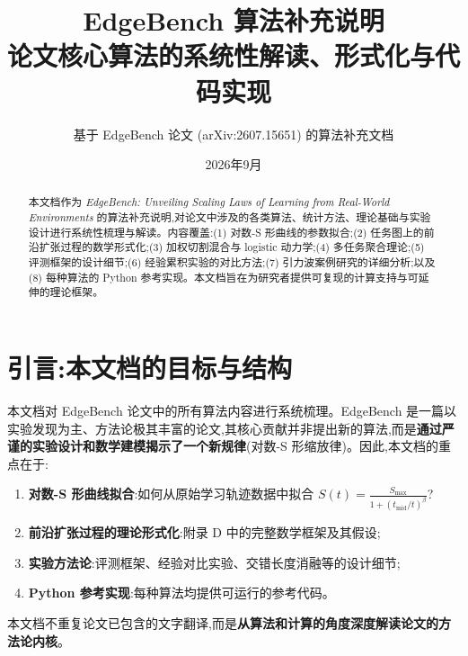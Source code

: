 \documentclass[a4paper,11pt]{article}
\begin{document}
\title{
    \vspace{-1.5em}
    {\LARGE\textbf{EdgeBench 算法补充说明}}\\[0.5em]
    {\large 论文核心算法的系统性解读、形式化与代码实现}
}

\author{基于 EdgeBench 论文 (arXiv:2607.15651) 的算法补充文档}
\date{2026年9月}

\maketitle

\begin{abstract}
本文档作为 \textit{EdgeBench: Unveiling Scaling Laws of Learning from Real-World Environments} 的算法补充说明,对论文中涉及的各类算法、统计方法、理论基础与实验设计进行系统性梳理与解读。内容覆盖:(1) 对数-S 形曲线的参数拟合;(2) 任务图上的前沿扩张过程的数学形式化;(3) 加权切割混合与 logistic 动力学;(4) 多任务聚合理论;(5) 评测框架的设计细节;(6) 经验累积实验的对比方法;(7) 引力波案例研究的详细分析;以及(8) 每种算法的 Python 参考实现。本文档旨在为研究者提供可复现的计算支持与可延伸的理论框架。
\end{abstract}

\tableofcontents
\newpage

\section{引言:本文档的目标与结构}

本文档对 EdgeBench 论文中的所有算法内容进行系统梳理。EdgeBench 是一篇以实验发现为主、方法论极其丰富的论文,其核心贡献并非提出新的算法,而是\textbf{通过严谨的实验设计和数学建模揭示了一个新规律}(对数-S 形缩放律)。因此,本文档的重点在于:

\begin{enumerate}
    \item \textbf{对数-S 形曲线拟合}:如何从原始学习轨迹数据中拟合 $S(t) = \frac{S_{\max}}{1 + (t_{\mathrm{mid}}/t)^{\beta}}$?
    \item \textbf{前沿扩张过程的理论形式化}:附录 D 中的完整数学框架及其假设;
    \item \textbf{实验方法论}:评测框架、经验对比实验、交错长度消融等的设计细节;
    \item \textbf{Python 参考实现}:每种算法均提供可运行的参考代码。
\end{enumerate}

本文档不重复论文已包含的文字翻译,而是\textbf{从算法和计算的角度深度解读论文的方法论内核}。
\end{document}
